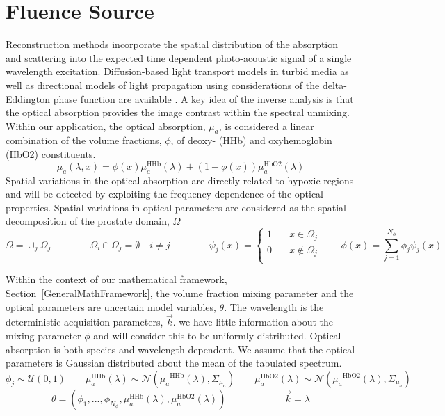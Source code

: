 \documentclass{article}         %
\theoremstyle{definition}
\theoremstyle{remark}
\begin{document}
\section{Fluence Source}\label{FluenceSource}

Reconstruction methods incorporate the spatial distribution of the
absorption and scattering into the expected time dependent photo-acoustic
signal of a single wavelength excitation. 
Diffusion-based light transport
models in turbid media
as well as  directional models of light
propagation using considerations of the delta-Eddington phase function 
are available
\cite{maclellan2013estimating,fuentesetal12a,fuentesetal09,Fuentesetal08}.
A key idea of the inverse analysis is that the optical
absorption provides the image contrast within the spectral unmixing. 
Within our application, the optical absorption, $\mu_a$, is considered a linear
combination of the volume fractions, $\phi$, of deoxy- (HHb) and oxyhemoglobin
(HbO2) constituents.
\[
\mu_a(\lambda,x) = \phi(x) \mu_a^\text{HHb} (\lambda) + (1-\phi(x))\mu_a^\text{HbO2}(\lambda)
\]
Spatial variations in the optical absorption are directly related to hypoxic
regions and will be detected by exploiting the frequency dependence of the
optical properties. Spatial variations in optical parameters are considered
as the spatial decomposition of the prostate domain, $\Omega$
\[
  \Omega = \cup_j \Omega_j
  \qquad \qquad
  \Omega_i \cap \Omega_j = \emptyset  \quad i \neq j
  \qquad \qquad
  \psi_j(x) = 
  \left\{
  \begin{split}
   1 & \quad x    \in \Omega_j \\
   0 & \quad x \notin \Omega_j \\
  \end{split}
   \right.
   \qquad
 \phi(x)  = \sum_{j=1}^{N_\phi} \phi_j \psi_j(x) 
\]

Within the context of our mathematical framework, Section~\ref{GeneralMathFramework},
the volume fraction mixing parameter and the optical parameters are
uncertain model variables, $\theta$. The wavelength is the deterministic
acquisition parameters, $\vec{k}$.
we have little information about the mixing parameter $\phi$ and will
consider this to be uniformly distributed. Optical absorption is both
species and wavelength dependent. We assume that the optical parameters is
Gaussian distributed about the mean of the tabulated spectrum.
\[ 
   \phi_j \sim \mathcal{U}(0,1) 
   \qquad 
  \mu_a^\text{HHb}(\lambda) \sim 
       \mathcal{N}\left( \bar{\mu_a}^\text{HHb}(\lambda) , \Sigma_{\mu_a} \right) 
   \qquad 
  \mu_a^\text{HbO2}(\lambda) \sim 
       \mathcal{N}\left( \bar{\mu_a}^\text{HbO2}(\lambda) , \Sigma_{\mu_a} \right) 
\]
\[
  \theta = 
  \left(
   \phi_1, ... , \phi_{N_\phi},
  \mu_a^\text{HHb}(\lambda) ,
  \mu_a^\text{HbO2}(\lambda)
  \right)
  \qquad \qquad \qquad
   \vec{k} = \lambda
\]
\end{document}
